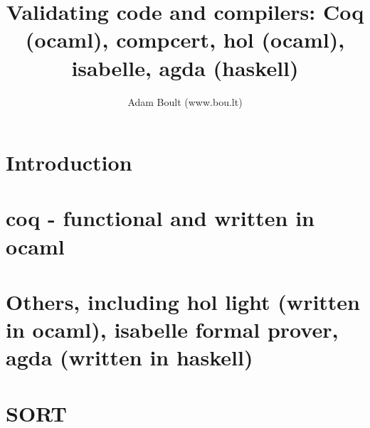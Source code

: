 \documentclass[oneside]{book}
\begin{document}
\author{Adam Boult (www.bou.lt)}
\title{Validating code and compilers: Coq (ocaml), compcert, hol (ocaml), isabelle, agda (haskell)}
\maketitle

\setcounter{tocdepth}{0}
\tableofcontents



\part{Introduction}

\part{coq - functional and written in ocaml}


\part{Others, including hol light (written in ocaml), isabelle formal prover, agda (written in haskell)}

\part{SORT}

\end{document}
